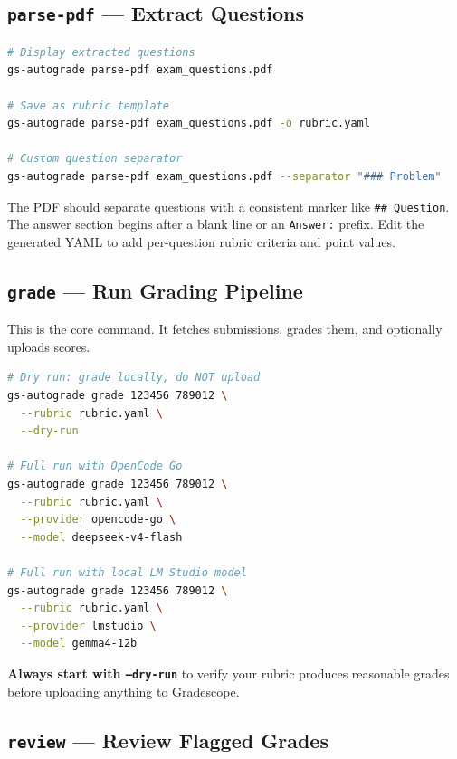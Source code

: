 \documentclass[11pt,a4paper]{article}
\begin{document}
\subsection{\texttt{parse-pdf} — Extract Questions}

\begin{lstlisting}[language=bash]
# Display extracted questions
gs-autograde parse-pdf exam_questions.pdf

# Save as rubric template
gs-autograde parse-pdf exam_questions.pdf -o rubric.yaml

# Custom question separator
gs-autograde parse-pdf exam_questions.pdf --separator "### Problem"
\end{lstlisting}

\begin{infobox}
The PDF should separate questions with a consistent marker like \texttt{\#\# Question}. The answer section begins after a blank line or an \texttt{Answer:} prefix. Edit the generated YAML to add per-question rubric criteria and point values.
\end{infobox}

\subsection{\texttt{grade} — Run Grading Pipeline}

This is the core command. It fetches submissions, grades them, and optionally uploads scores.

\begin{lstlisting}[language=bash]
# Dry run: grade locally, do NOT upload
gs-autograde grade 123456 789012 \
  --rubric rubric.yaml \
  --dry-run

# Full run with OpenCode Go
gs-autograde grade 123456 789012 \
  --rubric rubric.yaml \
  --provider opencode-go \
  --model deepseek-v4-flash

# Full run with local LM Studio model
gs-autograde grade 123456 789012 \
  --rubric rubric.yaml \
  --provider lmstudio \
  --model gemma4-12b
\end{lstlisting}

\begin{tipbox}
\textbf{Always start with \texttt{--dry-run}} to verify your rubric produces reasonable grades before uploading anything to Gradescope.
\end{tipbox}

\subsection{\texttt{review} — Review Flagged Grades}
\end{document}
